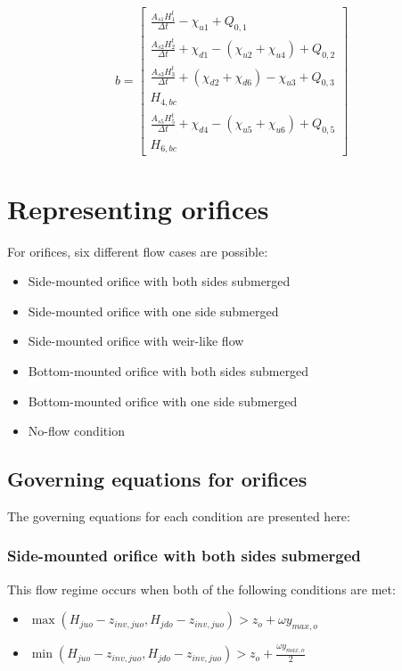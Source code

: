 \documentclass[11pt]{article}
\begin{document}
\begin{equation}
  b = 
  \begin{bmatrix}
    \frac{A_{s1} H_1^t}{\Delta t} - \chi_{u1} + Q_{0,1} \\
    \frac{A_{s2} H_2^t}{\Delta t} + \chi_{d1} - (\chi_{u2} + \chi_{u4}) + Q_{0,2} \\
    \frac{A_{s3} H_3^t}{\Delta t} + (\chi_{d2} + \chi_{d6}) - \chi_{u3} + Q_{0,3} \\
    H_{4,bc} \\
    \frac{A_{s5} H_5^t}{\Delta t} + \chi_{d4} - (\chi_{u5} + \chi_{u6}) + Q_{0,5} \\
    H_{6,bc}
  \end{bmatrix}
\end{equation}

\section{Representing orifices}

For orifices, six different flow cases are possible:

\begin{itemize}
\item Side-mounted orifice with both sides submerged
\item Side-mounted orifice with one side submerged
\item Side-mounted orifice with weir-like flow
\item Bottom-mounted orifice with both sides submerged
\item Bottom-mounted orifice with one side submerged
\item No-flow condition
\end{itemize}

\subsection{Governing equations for orifices}

The governing equations for each condition are presented here:

\subsubsection*{Side-mounted orifice with both sides submerged}

This flow regime occurs when both of the following conditions are met:

\begin{itemize}
\item $\max(H_{juo} - z_{inv,juo}, H_{jdo} - z_{inv,juo}) > z_o + \omega y_{max,o}$
\item $\min(H_{juo} - z_{inv,juo}, H_{jdo} - z_{inv,juo}) > z_o + \frac{\omega y_{max,o}}{2}$
\end{itemize}
\end{document}
